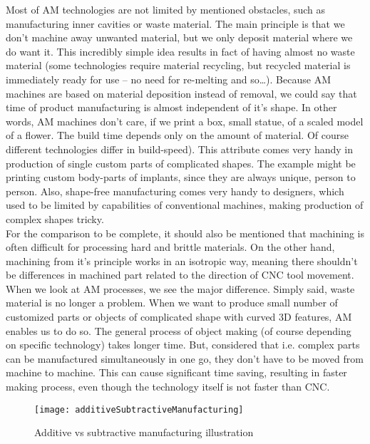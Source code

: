 \documentclass[a4paper]{report}
\begin{document}
Most of AM technologies are not limited by mentioned obstacles, such as manufacturing inner cavities or waste material. The main principle is that we don’t machine away unwanted material, but we only deposit material where we do want it. This incredibly simple idea results in fact of having almost no waste material (some technologies require material recycling, but recycled material is immediately ready for use – no need for re-melting and so…). Because AM machines are based on material deposition instead of removal, we could say that time of product manufacturing is almost independent of it’s shape. In other words, AM machines don’t care, if we print a box, small statue, of a scaled model of a flower. The build time depends only on the amount of material. Of course different technologies differ in build-speed). This attribute comes very handy in production of single custom parts of complicated shapes. The example might be printing custom body-parts of implants, since they are always unique, person to person. Also, shape-free manufacturing comes very handy to designers, which used to be limited by capabilities of conventional machines, making production of complex shapes tricky.\\
For the comparison to be complete, it should also be mentioned that machining is often difficult for processing hard and brittle materials. On the other hand, machining from it’s principle works in an isotropic way, meaning there shouldn’t be differences in machined part related to the direction of CNC tool movement.\\
When we look at AM processes, we see the major difference. Simply said, waste material is no longer a problem. When we want to produce small number of customized parts or objects of complicated shape with curved 3D features, AM enables us to do so. The general process of object making (of course depending on specific technology) takes longer time. But, considered that i.e. complex parts can be manufactured simultaneously in one go, they don’t have to be moved from machine to machine. This can cause significant time saving, resulting in faster making process, even though the technology itself is not faster than CNC.
\begin{figure}[h]
\centering
\texttt{[image: additiveSubtractiveManufacturing]}
\caption{Additive vs subtractive manufacturing illustration}
\end{figure}

\end{document}
